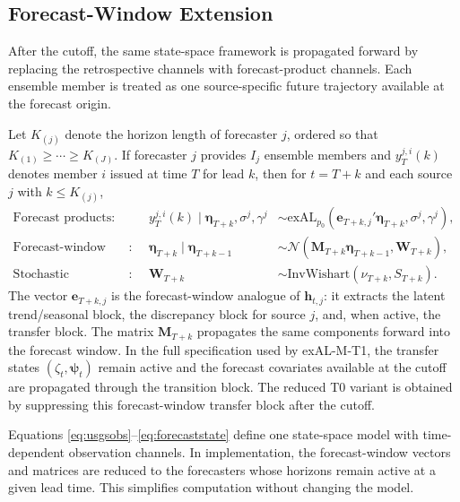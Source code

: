 \documentclass[APA,STIX1COL]{WileyNJD-v2}
\begin{document}
\subsection{Forecast-Window Extension}
\label{subsec:forecastwindow}

After the cutoff, the same state-space framework is propagated forward by replacing the retrospective channels with forecast-product channels. Each ensemble member is treated as one source-specific future trajectory available at the forecast origin.

Let \(K_{(j)}\) denote the horizon length of forecaster \(j\), ordered so that \(K_{(1)} \ge \cdots \ge K_{(J)}\). If forecaster \(j\) provides \(I_j\) ensemble members and \(y_T^{j,i}(k)\) denotes member \(i\) issued at time \(T\) for lead \(k\), then for \(t=T+k\) and each source \(j\) with \(k \le K_{(j)}\),
\begin{align}
    \text{Forecast products}:&& y_T^{j,i}(k) \mid \boldsymbol{\eta}_{T+k}, \sigma^j, \gamma^j &\sim \text{exAL}_{p_0}\!\left(\mathbf{e}_{T+k,j}' \boldsymbol{\eta}_{T+k}, \sigma^j, \gamma^j\right), \label{eq:forecastobs} \\
    \text{Forecast-window states}:&& \boldsymbol{\eta}_{T+k} \mid \boldsymbol{\eta}_{T+k-1} &\sim \mathcal{N}\!\left(\boldsymbol{M}_{T+k} \boldsymbol{\eta}_{T+k-1}, \mathbf{W}_{T+k}\right), \label{eq:forecaststate} \\
    \text{Stochastic covariance}:&& \mathbf{W}_{T+k} &\sim \text{InvWishart}(\nu_{T+k}, S_{T+k}).
\end{align}
The vector \(\mathbf{e}_{T+k,j}\) is the forecast-window analogue of \(\mathbf{h}_{t,j}\): it extracts the latent trend/seasonal block, the discrepancy block for source \(j\), and, when active, the transfer block. The matrix \(\boldsymbol{M}_{T+k}\) propagates the same components forward into the forecast window. In the full specification used by exAL-M-T1, the transfer states \((\zeta_t,\boldsymbol{\psi}_t)\) remain active and the forecast covariates available at the cutoff are propagated through the transition block. The reduced T0 variant is obtained by suppressing this forecast-window transfer block after the cutoff.

Equations \eqref{eq:usgsobs}--\eqref{eq:forecaststate} define one state-space model with time-dependent observation channels. In implementation, the forecast-window vectors and matrices are reduced to the forecasters whose horizons remain active at a given lead time. This simplifies computation without changing the model.
\end{document}

